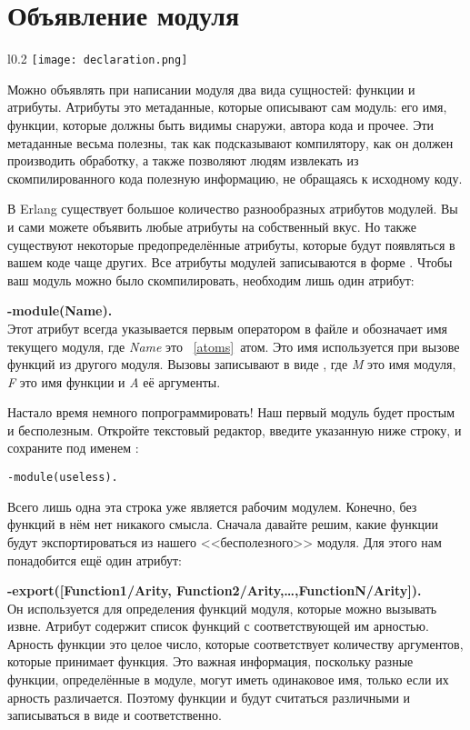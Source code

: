 \section{Объявление модуля}
\begin{wrapfigure}{l}{0.2\linewidth}
    \texttt{[image: declaration.png]}
\end{wrapfigure}
Можно объявлять при написании модуля два вида сущностей: функции и атрибуты.
Атрибуты это метаданные, которые описывают сам модуль: его имя, функции, которые должны быть видимы снаружи, автора кода и прочее.
Эти метаданные весьма полезны, так как подсказывают компилятору, как он должен производить обработку, а также позволяют людям извлекать из скомпилированного кода полезную информацию, не обращаясь к исходному коду.

В Erlang существует большое количество разнообразных атрибутов модулей.
Вы и сами можете объявить любые атрибуты на собственный вкус.
Но также существуют некоторые предопределённые атрибуты, которые будут появляться в вашем коде чаще других.
Все атрибуты модулей записываются в форме .
Чтобы ваш модуль можно было скомпилировать, необходим лишь один атрибут:

\begin{minipage}{1\linewidth}
    \textbf{-module(Name).}\\ 
    Этот атрибут всегда указывается первым оператором в файле и обозначает имя текущего модуля, где \emph{Name} это ~\ref{atoms}~атом.
    Это имя используется при вызове функций из другого модуля.
    Вызовы записывают в виде , где \emph{M} это имя модуля, \emph{F} это имя функции и \emph{A} её аргументы.
\end{minipage}

Настало время немного попрограммировать!
Наш первый модуль будет простым и бесполезным.
Откройте текстовый редактор, введите указанную ниже строку, и сохраните под именем :
\begin{lstlisting}[style=repl]
-module(useless).
\end{lstlisting}

Всего лишь одна эта строка уже является рабочим модулем.
Конечно, без функций в нём нет никакого смысла.
Сначала давайте решим, какие функции будут экспортироваться из нашего <<бесполезного>> модуля.
Для этого нам понадобится ещё один атрибут:

\begin{minipage}{1.0\linewidth}
    \textbf{-export([Function1/Arity, Function2/Arity,\ldots,FunctionN/Arity]).}\\ 
    Он используется для определения функций модуля, которые можно вызывать извне.
    Атрибут содержит список функций с соответствующей им арностью.
    Арность функции это целое число, которые соответствует количеству аргументов, которые принимает функция.
    Это важная информация, поскольку разные функции, определённые в модуле, могут иметь одинаковое имя, только если их арность различается.
    Поэтому функции  и  будут считаться различными и записываться в виде  и  соответственно.
\end{minipage}


